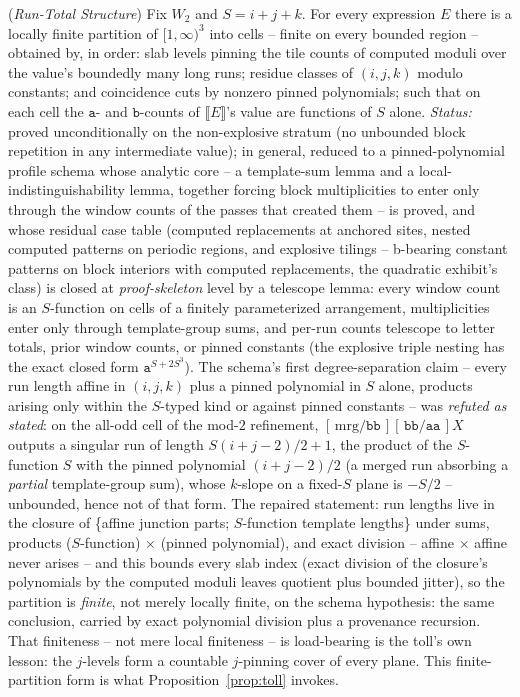 \documentclass[runningheads,envcountsect]{llncs}
\begin{document}
\begin{lemma}
    (\emph{Run-Total Structure})
    \label{lem:structure}
    Fix $W_2$ and $S = i + j + k$. For every expression $E$ there is a locally finite partition of $[1,\infty)^3$ into cells -- finite on every bounded region -- obtained by, in order: slab levels pinning the tile counts of computed moduli over the value's boundedly many long runs; residue classes of $(i,j,k)$ modulo constants; and coincidence cuts by nonzero pinned polynomials; such that on each cell the $\mathtt a$- and $\mathtt b$-counts of $\llbracket E \rrbracket$'s value are functions of $S$ alone. \emph{Status:} proved unconditionally on the non-explosive stratum (no unbounded block repetition in any intermediate value); in general, reduced to a pinned-polynomial profile schema whose analytic core -- a template-sum lemma and a local-indistinguishability lemma, together forcing block multiplicities to enter only through the window counts of the passes that created them -- is proved, and whose residual case table (computed replacements at anchored sites, nested computed patterns on periodic regions, and explosive tilings -- b-bearing constant patterns on block interiors with computed replacements, the quadratic exhibit's class) is closed at \emph{proof-skeleton} level by a telescope lemma: every window count is an $S$-function on cells of a finitely parameterized arrangement, multiplicities enter only through template-group sums, and per-run counts telescope to letter totals, prior window counts, or pinned constants (the explosive triple nesting has the exact closed form $\mathtt a^{S + 2S^3}$). The schema's first degree-separation claim -- every run length affine in $(i,j,k)$ plus a pinned polynomial in $S$ alone, products arising only within the $S$-typed kind or against pinned constants -- was \emph{refuted as stated}: on the all-odd cell of the mod-$2$ refinement, $[\,\mathrm{mrg}/\mathtt{bb}\,][\,\mathtt{bb}/\mathtt{aa}\,]X$ outputs a singular run of length $S(i+j-2)/2 + 1$, the product of the $S$-function $S$ with the pinned polynomial $(i+j-2)/2$ (a merged run absorbing a \emph{partial} template-group sum), whose $k$-slope on a fixed-$S$ plane is $-S/2$ -- unbounded, hence not of that form. The repaired statement: run lengths live in the closure of \{affine junction parts; $S$-function template lengths\} under sums, products ($S$-function) $\times$ (pinned polynomial), and exact division -- affine $\times$ affine never arises -- and this bounds every slab index (exact division of the closure's polynomials by the computed moduli leaves quotient plus bounded jitter), so the partition is \emph{finite}, not merely locally finite, on the schema hypothesis: the same conclusion, carried by exact polynomial division plus a provenance recursion. That finiteness -- not mere local finiteness -- is load-bearing is the toll's own lesson: the $j$-levels form a countable $j$-pinning cover of every plane. This finite-partition form is what Proposition~\ref{prop:toll} invokes.
\end{lemma}
\end{document}
